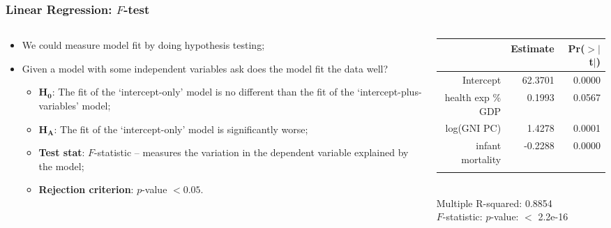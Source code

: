 \documentclass[aspectratio=169]{beamer}
\theoremstyle{principle}
\begin{document}
\begin{frame}
\frametitle{Linear Regression: $F$-test}

\begin{columns}
\begin{column}{0.5\textwidth}

\begin{itemize}
\item We could measure model fit by doing hypothesis testing;
\bigskip
\bigskip

\item Given a model with some independent variables ask does the model fit the data well?
\begin{itemize}
\item $\mathbf{H_0}$: The fit of the `intercept-only' model is no different than the fit of the `intercept-plus-variables' model;
\item $\mathbf{H_A}$: The fit of the `intercept-only' model is significantly worse;
\item \textbf{Test stat}: $F$-statistic -- measures the variation in the dependent variable explained by the model;
\item \textbf{Rejection criterion}: $p$-value $< 0.05$.
\end{itemize}


\end{itemize}

\end{column}
\begin{column}{0.5\textwidth}

\begin{table}[ht]
\centering
\begin{tabular}{rrr}
  \hline
   \hline
 & Estimate & Pr($>$$|$t$|$) \\ 
  \hline
   \hline
Intercept & 62.3701 & 0.0000 \\ 
  health exp \% GDP & 0.1993 & 0.0567 \\ 
  log(GNI PC) & 1.4278 & 0.0001 \\ 
  infant mortality & -0.2288 & 0.0000 \\ 
   \hline
   \hline
   &&\\
\end{tabular}\\
Multiple R-squared:  0.8854\\ 
$F$-statistic: $p$-value: $<$ 2.2e-16
\end{table}

\end{column}
\end{columns}

\end{frame}
\end{document}
